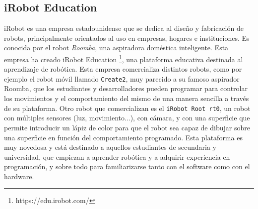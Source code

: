\documentclass{report}
\begin{document}
\newpage
\subsection{iRobot Education}

iRobot es una empresa estadounidense que se dedica al diseño y fabricación de robots, principalmente orientados al uso en empresas, hogares e instituciones. Es conocida por el robot \textit{Roomba}, una aspiradora doméstica inteligente. Esta empresa ha creado iRobot Education \footnote{https://edu.irobot.com/}, una plataforma educativa destinada al aprendizaje de robótica. Esta empresa comercializa distintos robots, como por ejemplo el  robot móvil llamado \texttt{Create2}, muy parecido a su famoso aspirador Roomba, que los estudiantes y desarrolladores pueden programar para controlar los movimientos y el comportamiento del mismo de una manera sencilla a través de su plataforma. Otro robot que comercializan es el \texttt{iRobot Root rt0}, un robot con múltiples sensores (luz, movimiento...), con cámara, y con una superficie que permite introducir un lápiz de color para que el robot sea capaz de dibujar sobre una superficie en función del comportamiento programado. Esta plataforma es muy novedosa y  está destinado a aquellos estudiantes de secundaria y universidad, que empiezan a aprender robótica y a adquirir experiencia en programación, y sobre todo para familiarizarse tanto con el software como con el hardware.
\end{document}
